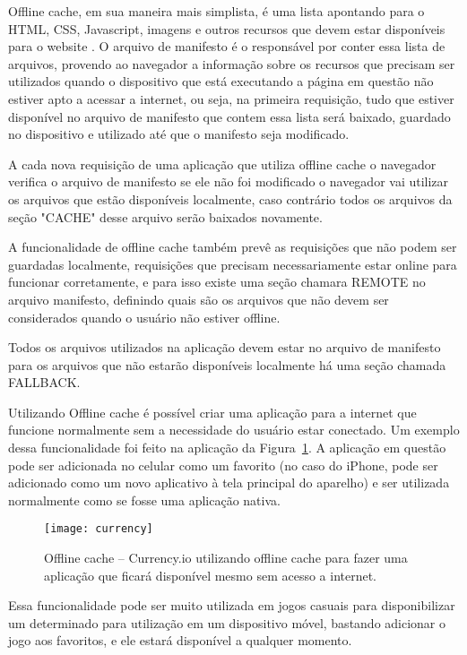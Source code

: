 Offline cache, em sua maneira mais simplista, é uma lista apontando
para o HTML, CSS, Javascript, imagens e outros recursos que devem
estar disponíveis para o website \cite{pilgrim2010html5}. O arquivo de
manifesto é o responsável por conter essa lista de arquivos, provendo
ao navegador a informação sobre os recursos que
precisam ser utilizados quando o dispositivo que está executando a
página em questão não estiver apto a acessar a internet, ou seja,
na primeira requisição, tudo que estiver disponível no arquivo de manifesto
que contem essa lista será baixado, guardado no dispositivo e utilizado até
que o manifesto seja modificado.

A cada nova requisição de uma aplicação que utiliza offline cache o
navegador verifica o arquivo de manifesto se ele não foi modificado
o navegador vai utilizar os arquivos que estão disponíveis localmente,
caso contrário todos os arquivos da seção "CACHE" desse arquivo serão baixados novamente.

A funcionalidade de offline cache também prevê as requisições que não
podem ser guardadas localmente, requisições que precisam
necessariamente estar online para funcionar corretamente, e para isso
existe uma seção chamara REMOTE no arquivo manifesto, definindo quais
são os arquivos que não devem ser considerados quando o usuário não
estiver offline.

Todos os arquivos utilizados na aplicação devem estar no arquivo de
manifesto para os arquivos que não estarão disponíveis localmente há
uma seção chamada FALLBACK.

Utilizando Offline cache é possível criar uma aplicação para a
internet que funcione normalmente sem a necessidade do usuário estar
conectado. Um exemplo dessa funcionalidade foi feito na aplicação da
Figura~\ref{img:currency}. A aplicação em questão pode ser adicionada
no celular como um favorito (no caso do iPhone, pode ser adicionado
como um novo aplicativo à tela principal do aparelho) e ser utilizada
normalmente como se fosse uma aplicação nativa.

\begin{figure}[H]
  \centering
	\texttt{[image: currency]}
  \caption{Offline cache {--} Currency.io utilizando offline cache
  para fazer uma aplicação que ficará disponível mesmo sem acesso a
  internet.}
  \label{img:currency}
\end{figure}

Essa funcionalidade pode ser muito utilizada em jogos casuais para disponibilizar um
determinado para utilização em um dispositivo móvel, bastando
adicionar o jogo aos favoritos, e ele estará disponível a qualquer
momento.


